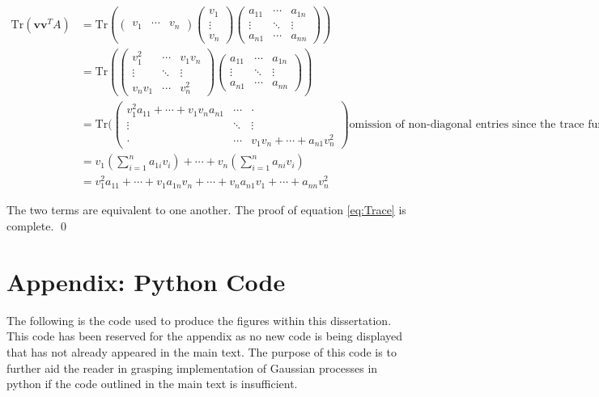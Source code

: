 \documentclass[12pt,a4paper]{article}
\begin{document}
\begin{align*}
\text{Tr}(\mathbf{v} \mathbf{v}^T A) &= \text{Tr}(\begin{pmatrix} v_1 & \cdots & v_n \end{pmatrix} \begin{pmatrix} v_1 \\ \vdots \\ v_n \end{pmatrix} \begin{pmatrix} a_{11} & \cdots & a_{1n} \\
\vdots & \ddots & \vdots \\
a_{n1} & \cdots & a_{nn} \end{pmatrix})  \\
&= \text{Tr}( \begin{pmatrix} v_1^2 & \cdots & v_1 v_n \\
\vdots & \ddots & \vdots \\
v_n v_1 & \cdots & v_n^2 \end{pmatrix} \begin{pmatrix} a_{11} & \cdots & a_{1n} \\
\vdots & \ddots & \vdots \\
a_{n1} & \cdots & a_{nn} \end{pmatrix}) \\
&= \text{Tr}( \begin{pmatrix} v_1^2 a_{11} + \cdots + v_1 v_n a_{n1}  & \cdots & \cdot \\
\vdots & \ddots & \vdots \\
\cdot & \cdots & v_1 v_n + \cdots + a_{n1} v_n^2 \end{pmatrix} \text{omission of non-diagonal entries since the trace function is the sum of diagonal entries}\\
&= v_1 \left( \sum_{i=1}^{n} a_{1i} v_i \right) + \cdots + v_n \left( \sum_{i=1}^{n} a_{ni} v_i \right) \\
&= v_1^2 a_{11} + \cdots + v_1 a_{1n}  v_n  + \cdots + v_n a_{n1}  v_1 + \cdots + a_{nn}  v_n^2
\end{align*}

The two terms are equivalent to one another. The proof of equation \eqref{eq:Trace} is complete.
\hfill \qed

\section{Appendix: Python Code}
\label{Appendix: Python Code}

The following is the code used to produce the figures within this dissertation. This code has been reserved for the appendix as no new code is being displayed that has not already appeared in the main text. The purpose of this code is to further aid the reader in grasping implementation of Gaussian processes in python if the code outlined in the main text is insufficient. 
\end{document}
